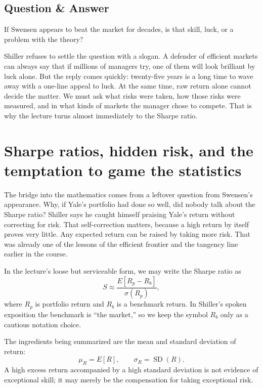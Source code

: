 \subsection{Question \& Answer}

If Swensen appears to beat the market for decades, is that skill, luck, or a problem with the theory?

Shiller refuses to settle the question with a slogan. A defender of efficient markets can always say that if millions of managers try, one of them will look brilliant by luck alone. But the reply comes quickly: twenty-five years is a long time to wave away with a one-line appeal to luck. At the same time, raw return alone cannot decide the matter. We must ask what risks were taken, how those risks were measured, and in what kinds of markets the manager chose to compete. That is why the lecture turns almost immediately to the Sharpe ratio.

\section{Sharpe ratios, hidden risk, and the temptation to game the statistics}

The bridge into the mathematics comes from a leftover question from Swensen's appearance. Why, if Yale's portfolio had done so well, did nobody talk about the Sharpe ratio? Shiller says he caught himself praising Yale's return without correcting for risk. That self-correction matters, because a high return by itself proves very little. Any expected return can be raised by taking more risk. That was already one of the lessons of the efficient frontier and the tangency line earlier in the course.

In the lecture's loose but serviceable form, we may write the Sharpe ratio as
\begin{equation}
S \approx \frac{E[R_p - R_b]}{\sigma(R_p)},
\end{equation}
where \(R_p\) is portfolio return and \(R_b\) is a benchmark return. In Shiller's spoken exposition the benchmark is ``the market,'' so we keep the symbol \(R_b\) only as a cautious notation choice.

The ingredients being summarized are the mean and standard deviation of return:
\begin{equation}
\mu_R = E[R], \qquad \sigma_R = \operatorname{SD}(R).
\end{equation}
A high excess return accompanied by a high standard deviation is not evidence of exceptional skill; it may merely be the compensation for taking exceptional risk.

